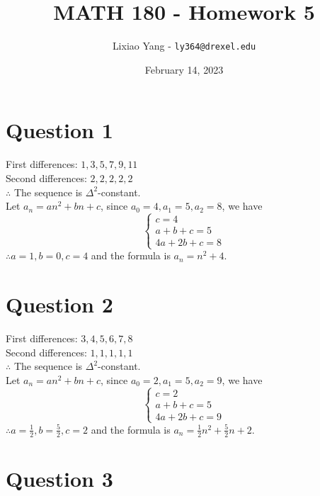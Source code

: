 \documentclass[11pt, oneside]{article}   	%
\title{\bf MATH 180 - Homework 5}
\author{Lixiao Yang - \texttt{ly364@drexel.edu}}
\date{February 14, 2023}							%
\begin{document}
\maketitle

\section*{Question 1}

	First differences: ${1,3,5,7,9,11}$\\
	Second differences: ${2,2,2,2,2}$\\
	$\therefore$ The sequence is $\Delta^{2}$-constant.\\
	Let $a_{n}=an^{2}+bn+c$, since $a_{0}=4, a_{1}=5, a_{2}=8$, we have \\
	\begin{equation}
		\left \{
			\begin{aligned}
			c=4\\
			a+b+c=5\\
			4a+2b+c=8
			\end{aligned}
		\right .
	\end{equation}
	$\therefore a=1,b=0,c=4$ and the formula is $a_{n}=n^{2}+4$.

\section*{Question 2}

	First differences: ${3,4,5,6,7,8}$\\
	Second differences: ${1,1,1,1,1}$\\
	$\therefore$ The sequence is $\Delta^{2}$-constant.\\
	Let $a_{n}=an^{2}+bn+c$, since $a_{0}=2, a_{1}=5, a_{2}=9$, we have \\
	\begin{equation}
		\left \{
			\begin{aligned}
			c=2\\
			a+b+c=5\\
			4a+2b+c=9
			\end{aligned}
		\right .
	\end{equation}
	$\therefore a=\frac{1}{2},b=\frac{5}{2},c=2$ and the formula is $a_{n}=\frac{1}{2}n^{2}+\frac{5}{2}n+2$.

\section*{Question 3}
\end{document}
